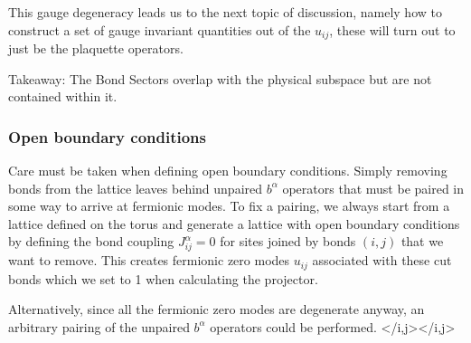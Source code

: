 This gauge degeneracy leads us to the next topic of discussion, namely how to construct a set of gauge invariant quantities out of the \(u_{ij}\), these will turn out to just be the plaquette operators.

Takeaway: The Bond Sectors overlap with the physical subspace but are not contained within it.

\hypertarget{open-boundary-conditions}{%
\subsubsection{Open boundary conditions}\label{open-boundary-conditions}}

Care must be taken when defining open boundary conditions. Simply removing bonds from the lattice leaves behind unpaired \(b^\alpha\) operators that must be paired in some way to arrive at fermionic modes. To fix a pairing, we always start from a lattice defined on the torus and generate a lattice with open boundary conditions by defining the bond coupling \(J^{\alpha}_{ij} = 0\) for sites joined by bonds \((i,j)\) that we want to remove. This creates fermionic zero modes \(u_{ij}\) associated with these cut bonds which we set to 1 when calculating the projector.

Alternatively, since all the fermionic zero modes are degenerate anyway, an arbitrary pairing of the unpaired \(b^\alpha\) operators could be performed. \textless/i,j\textgreater\textless/i,j\textgreater{}

